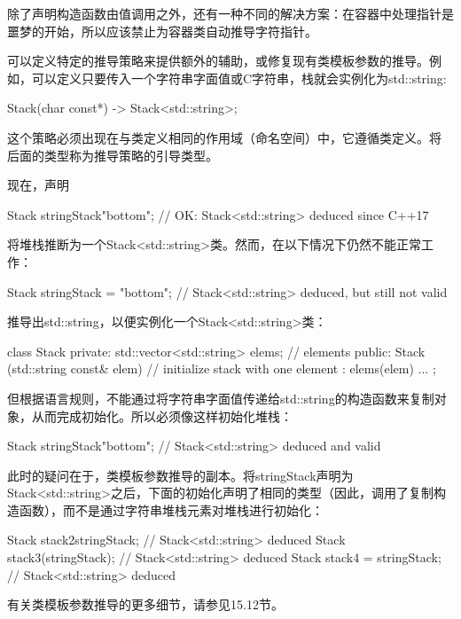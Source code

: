 除了声明构造函数由值调用之外，还有一种不同的解决方案：在容器中处理指针是噩梦的开始，所以应该禁止为容器类自动推导字符指针。

可以定义特定的推导策略来提供额外的辅助，或修复现有类模板参数的推导。例如，可以定义只要传入一个字符串字面值或C字符串，栈就会实例化为std::string:

\begin{cpp}
Stack(char const*) -> Stack<std::string>;
\end{cpp}

这个策略必须出现在与类定义相同的作用域（命名空间）中，它遵循类定义。将 \inlcpp{->} 后面的类型称为推导策略的引导类型。

现在，声明

\begin{cpp}
Stack stringStack{"bottom"}; // OK: Stack<std::string> deduced since C++17
\end{cpp}

将堆栈推断为一个Stack<std::string>类。然而，在以下情况下仍然不能正常工作：

\begin{cpp}
Stack stringStack = "bottom"; // Stack<std::string> deduced, but still not valid
\end{cpp}

推导出std::string，以便实例化一个Stack<std::string>类：

\begin{cpp}
class Stack {
private:
	std::vector<std::string> elems; // elements
public:
	Stack (std::string const& elem) // initialize stack with one element
	: elems({elem}) {
	}
	...
};
\end{cpp}

但根据语言规则，不能通过将字符串字面值传递给std::string的构造函数来复制对象，从而完成初始化。所以必须像这样初始化堆栈：

\begin{cpp}
Stack stringStack{"bottom"}; // Stack<std::string> deduced and valid
\end{cpp}

此时的疑问在于，类模板参数推导的副本。将stringStack声明为Stack<std::string>之后，下面的初始化声明了相同的类型（因此，调用了复制构造函数），而不是通过字符串堆栈元素对堆栈进行初始化：

\begin{cpp}
Stack stack2{stringStack}; // Stack<std::string> deduced
Stack stack3(stringStack); // Stack<std::string> deduced
Stack stack4 = {stringStack}; // Stack<std::string> deduced
\end{cpp}

有关类模板参数推导的更多细节，请参见15.12节。





















